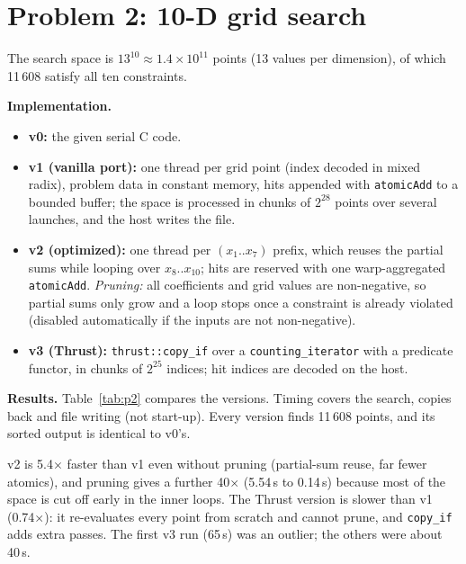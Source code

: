 \documentclass[11pt,a4paper]{article}
\begin{document}
\section{Problem 2: 10-D grid search}
The search space is $13^{10}\approx1.4\times10^{11}$ points (13 values per dimension), of which 11\,608 satisfy all ten constraints.

\textbf{Implementation.}
\begin{itemize}\setlength\itemsep{0pt}
\item \textbf{v0:} the given serial C code.
\item \textbf{v1 (vanilla port):} one thread per grid point (index decoded in mixed radix), problem data in constant memory, hits appended with \texttt{atomicAdd} to a bounded buffer; the space is processed in chunks of $2^{28}$ points over several launches, and the host writes the file.
\item \textbf{v2 (optimized):} one thread per $(x_1..x_7)$ prefix, which reuses the partial sums while looping over $x_8..x_{10}$; hits are reserved with one warp-aggregated \texttt{atomicAdd}. \emph{Pruning:} all coefficients and grid values are non-negative, so partial sums only grow and a loop stops once a constraint is already violated (disabled automatically if the inputs are not non-negative).
\item \textbf{v3 (Thrust):} \texttt{thrust::copy\_if} over a \texttt{counting\_iterator} with a predicate functor, in chunks of $2^{25}$ indices; hit indices are decoded on the host.
\end{itemize}

\textbf{Results.}
Table~\ref{tab:p2} compares the versions. Timing covers the search, copies back and file writing (not start-up). Every version finds 11\,608 points, and its sorted output is identical to v0's.

\begin{table}[h]
\centering\small
\resizebox{\linewidth}{!}{}
\caption{Problem 2: total time on the A40 (v0 on the server CPU). v2 + pruning is the final version (block size 128, 3 runs).}
\label{tab:p2}
\end{table}

v2 is 5.4$\times$ faster than v1 even without pruning (partial-sum reuse, far fewer atomics), and pruning gives a further 40$\times$ (5.54\,s to 0.14\,s) because most of the space is cut off early in the inner loops.
The Thrust version is slower than v1 (0.74$\times$): it re-evaluates every point from scratch and cannot prune, and \texttt{copy\_if} adds extra passes.
The first v3 run (65\,s) was an outlier; the others were about 40\,s.
\end{document}
